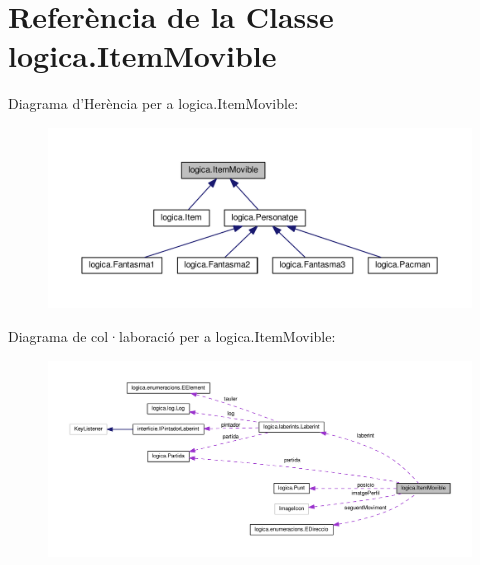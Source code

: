 \hypertarget{classlogica_1_1_item_movible}{\section{Referència de la Classe logica.\+Item\+Movible}
\label{classlogica_1_1_item_movible}
}


Diagrama d'Herència per a logica.\+Item\+Movible\+:\nopagebreak
\begin{figure}[H]
\begin{center}
\leavevmode
\includegraphics[width=350pt]{classlogica_1_1_item_movible__inherit__graph}
\end{center}
\end{figure}


Diagrama de col·laboració per a logica.\+Item\+Movible\+:\nopagebreak
\begin{figure}[H]
\begin{center}
\leavevmode
\includegraphics[width=350pt]{classlogica_1_1_item_movible__coll__graph}
\end{center}
\end{figure}

